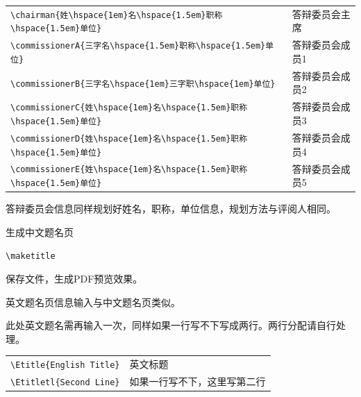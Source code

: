 \vspace{8pt}
{
\linespread{1}
\noindent
\begin{tabular}{ll}
\verb+\chairman{姓\hspace{1em}名\hspace{1.5em}职称\hspace{1.5em}单位}+ & 答辩委员会主席\\
\verb+\commissionerA{三字名\hspace{1.5em}职称\hspace{1.5em}单位}+ & 答辩委员会成员1\\
\verb+\commissionerB{三字名\hspace{1em}三字职\hspace{1em}单位}+ & 答辩委员会成员2\\
\verb+\commissionerC{姓\hspace{1em}名\hspace{1.5em}职称\hspace{1.5em}单位}+ & 答辩委员会成员3\\
\verb+\commissionerD{姓\hspace{1em}名\hspace{1.5em}职称\hspace{1.5em}单位}+ & 答辩委员会成员4\\
\verb+\commissionerE{姓\hspace{1em}名\hspace{1.5em}职称\hspace{1.5em}单位}+ & 答辩委员会成员5\\
\end{tabular}
}

\vspace{8pt}

答辩委员会信息同样规划好姓名，职称，单位信息，规划方法与评阅人相同。

生成中文题名页

\vspace{8pt}
\verb+\maketitle+
\vspace{8pt}

保存文件，生成PDF预览效果。

英文题名页信息输入与中文题名页类似。

此处英文题名需再输入一次，同样如果一行写不下写成两行。两行分配请自行处理。

{
\linespread{1}
\noindent
\begin{tabular}{p{7cm}l}
\verb+\Etitle{English Title}+ & 英文标题\\
\verb+\Etitletl{Second Line}+ & 如果一行写不下，这里写第二行\\
\end{tabular}
}

